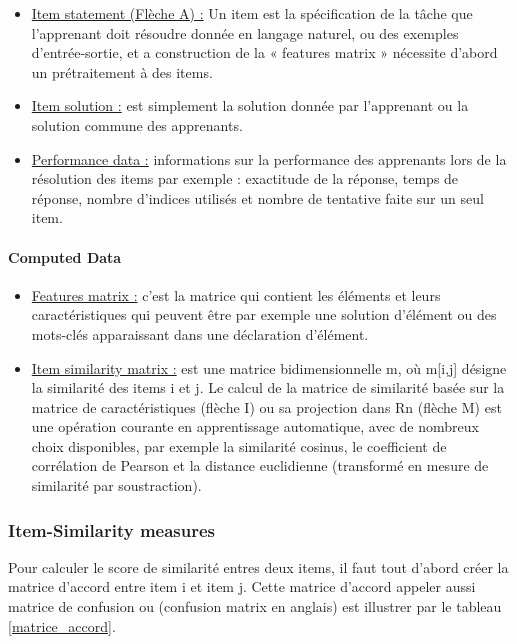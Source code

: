\begin{itemize}
    \item \underline{Item statement (Flèche A) :} Un item est la spécification de la tâche que l’apprenant doit résoudre donnée en langage naturel, ou des exemples d’entrée-sortie, et a construction de la « features matrix » nécessite d’abord un prétraitement à des items.
\end{itemize}

\begin{itemize}
    \item \underline{Item solution :} est simplement la solution donnée par l’apprenant ou la solution commune des apprenants.
\end{itemize}

\begin{itemize}
    \item \underline{Performance data :} informations sur la performance des apprenants lors de la résolution des items par exemple : exactitude de la réponse, temps de réponse, nombre d'indices utilisés et nombre de tentative faite sur un seul item.
\end{itemize}

\paragraph{Computed Data}

\begin{itemize}
    \item \underline{Features matrix :} c'est la matrice qui contient les éléments et leurs caractéristiques qui peuvent être par exemple une solution d'élément ou des mots-clés apparaissant dans une déclaration d'élément.
	\item \underline{Item similarity matrix :} est une matrice bidimensionnelle m, où m[i,j] désigne la similarité des items i et j. Le calcul de la matrice de similarité basée sur la matrice de caractéristiques (flèche I) ou sa projection dans Rn (flèche M) est une opération courante en apprentissage automatique, avec de nombreux choix disponibles, par exemple la similarité cosinus, le coefficient de corrélation de Pearson et la distance euclidienne (transformé en mesure de similarité par soustraction).
\end{itemize}

\subsubsection{Item-Similarity measures}
Pour calculer le score de similarité entres deux items, il faut tout d’abord créer la matrice d’accord entre item i et item j. Cette matrice d’accord appeler aussi matrice de confusion ou (confusion matrix en anglais) est illustrer par le tableau \ref{matrice_accord}.

